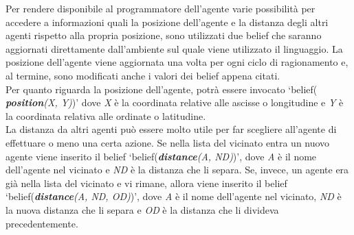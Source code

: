 \medskip
Per rendere disponibile al programmatore dell'agente varie possibilit\`a per accedere a informazioni quali la posizione dell'agente e la distanza degli altri agenti rispetto alla propria posizione, sono utilizzati due belief che saranno aggiornati direttamente dall'ambiente sul quale viene utilizzato il linguaggio. La posizione dell'agente viene aggiornata una volta per ogni ciclo di ragionamento e, al termine, sono modificati anche i valori dei belief appena citati. 
\\
Per quanto riguarda la posizione dell'agente, potr\`a essere invocato `belief( \textit{\textbf{position}(X, Y)})' dove \textit{X} \`e la coordinata relative alle ascisse o longitudine e \textit{Y} \`e la coordinata relativa alle ordinate o latitudine.
\\
La distanza da altri agenti pu\`o essere molto utile per far scegliere all'agente di effettuare o meno una certa azione. Se nella lista del vicinato entra un nuovo agente viene inserito il belief `belief(\textit{\textbf{distance}(A, ND)})', dove \textit{A} \`e il nome dell'agente nel vicinato e \textit{ND} \`e la distanza che li separa. Se, invece, un agente era gi\`a nella lista del vicinato e vi rimane, allora viene inserito il belief `belief(\textit{\textbf{distance}(A, ND, OD)})', dove \textit{A} \`e il nome dell'agente nel vicinato, \textit{ND} \`e la nuova distanza che li separa e \textit{OD} \`e la distanza che li divideva precedentemente.

